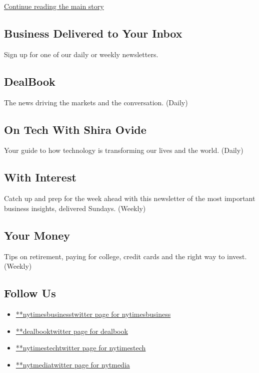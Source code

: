 \protect\hyperlink{after-mktg}{Continue reading the main story}

\hypertarget{business-delivered-to-your-inbox}{%
\subsection{Business Delivered to Your
Inbox}\label{business-delivered-to-your-inbox}}

Sign up for one of our daily or weekly newsletters.

\hypertarget{dealbook}{%
\subsection{DealBook}\label{dealbook}}

The news driving the markets and the conversation. (Daily)

\hypertarget{on-tech-with-shira-ovide}{%
\subsection{On Tech With Shira Ovide}\label{on-tech-with-shira-ovide}}

Your guide to how technology is transforming our lives and the world.
(Daily)

\hypertarget{with-interest-1}{%
\subsection{With Interest}\label{with-interest-1}}

Catch up and prep for the week ahead with this newsletter of the most
important business insights, delivered Sundays. (Weekly)

\hypertarget{your-money}{%
\subsection{Your Money}\label{your-money}}

Tips on retirement, paying for college, credit cards and the right way
to invest. (Weekly)

\hypertarget{follow-us}{%
\subsection{Follow Us}\label{follow-us}}

\begin{itemize}
\tightlist
\item
  \href{https://twitter.com/nytimesbusiness}{**nytimesbusinesstwitter
  page for nytimesbusiness}
\item
  \href{https://twitter.com/dealbook}{**dealbooktwitter page for
  dealbook}
\item
  \href{https://twitter.com/nytimestech}{**nytimestechtwitter page for
  nytimestech}
\item
  \href{https://twitter.com/nytmedia}{**nytmediatwitter page for
  nytmedia}
\end{itemize}


